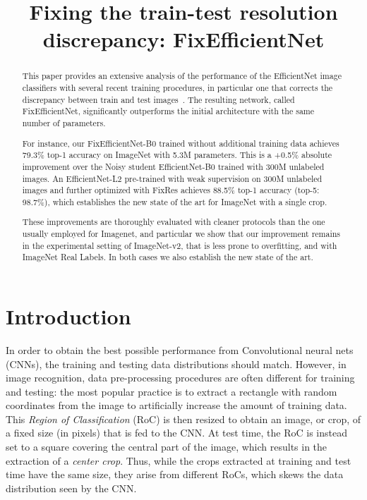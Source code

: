 \documentclass{article}
\title{Fixing the train-test resolution discrepancy: FixEfficientNet}
\begin{document}
\maketitle
\begin{abstract}

This paper provides an extensive analysis of the performance of the EfficientNet image classifiers with several recent training procedures, in particular one that corrects the discrepancy between train and test images~\cite{Touvron2019FixRes}. 
The resulting network, called FixEfficientNet, significantly outperforms the initial architecture with the same number of parameters. 
 
For instance, our FixEfficientNet-B0 trained without additional training data achieves 79.3\% top-1 accuracy on ImageNet with 5.3M parameters. This is a +0.5\% absolute improvement over the Noisy student EfficientNet-B0 trained with 300M unlabeled images. 
An EfficientNet-L2 pre-trained with weak supervision on 300M unlabeled images  
and further optimized with FixRes  
achieves {88.5\%} top-1 accuracy (top-5: {98.7\%}), 
which establishes the new state of the art for ImageNet with a single crop.

These improvements are thoroughly evaluated with cleaner protocols than the one usually employed for Imagenet, and particular we show that our improvement remains in the experimental setting of ImageNet-v2, that is less prone to overfitting, and with ImageNet Real Labels. In both cases we also establish the new state of the art. 
\end{abstract}


\section{Introduction}\label{sec:introduction}

In order to obtain the best possible performance from Convolutional neural nets (CNNs), the training and testing data distributions should match.
However, in image recognition, data pre-processing procedures are often different for training and testing:
the most popular practice is to extract a rectangle with random coordinates from the image to artificially increase the amount of training data.
This \emph{Region of Classification} (RoC) is then resized to obtain an image, or crop, of a fixed size (in pixels) that is fed to the CNN.
At test time, the RoC is instead set to a square covering the central part of the image, which results in the extraction of a \emph{center crop}.
Thus, while the crops extracted at training and test time have the same size, they arise from different RoCs, which skews the data distribution seen by the CNN.
\end{document}

